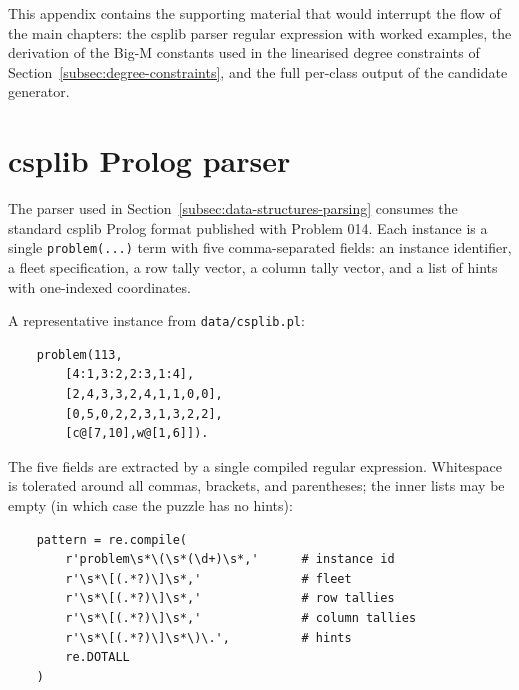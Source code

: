 %

This appendix contains the supporting material that would interrupt the flow of the main chapters: the \gls{csplib} parser regular expression with worked examples, the derivation of the Big-M constants used in the linearised degree constraints of Section~\ref{subsec:degree-constraints}, and the full per-class output of the candidate generator.

\section[CSPLib Prolog parser]{\gls{csplib} Prolog parser}\label{app:parser}

The parser used in Section~\ref{subsec:data-structures-parsing} consumes the standard \gls{csplib} Prolog format published with Problem 014. Each instance is a single \verb|problem(...)| term with five comma-separated fields: an instance identifier, a fleet specification, a row tally vector, a column tally vector, and a list of hints with one-indexed coordinates.

A representative instance from \verb|data/csplib.pl|:
\begin{verbatim}
    problem(113,
        [4:1,3:2,2:3,1:4],
        [2,4,3,3,2,4,1,1,0,0],
        [0,5,0,2,2,3,1,3,2,2],
        [c@[7,10],w@[1,6]]).
\end{verbatim}

The five fields are extracted by a single compiled regular expression. Whitespace is tolerated around all commas, brackets, and parentheses; the inner lists may be empty (in which case the puzzle has no hints):
\begin{verbatim}
    pattern = re.compile(
        r'problem\s*\(\s*(\d+)\s*,'      # instance id
        r'\s*\[(.*?)\]\s*,'              # fleet
        r'\s*\[(.*?)\]\s*,'              # row tallies
        r'\s*\[(.*?)\]\s*,'              # column tallies
        r'\s*\[(.*?)\]\s*\)\.',          # hints
        re.DOTALL
    )
\end{verbatim}

